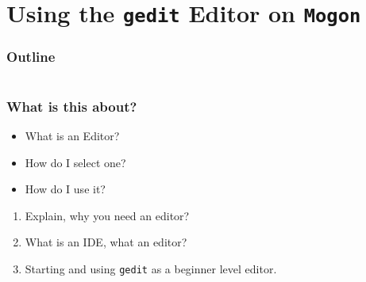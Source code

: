 \section{Using the \texttt{gedit} Editor on \texttt{Mogon}}

\begin{frame}
	\frametitle{Outline}
	\begin{columns}[t]
		\begin{column}{.5\textwidth}
			\tableofcontents[sections={1-9},currentsection]
		\end{column}
		\begin{column}{.5\textwidth}
			\tableofcontents[sections={10-18},currentsection]
		\end{column}
	\end{columns}
\end{frame}

\begin{frame}
	\frametitle{What is this about?}
	\begin{question}[Questions]\begin{itemize}
			\item What is an Editor?
			\item How do I select one?
			\item How do I use it?
		\end{itemize}
	\end{question}
	\begin{docs}[Objectives]
		\begin{enumerate}
			\item Explain, why you need an editor?
			\item What is an IDE, what an editor?
			\item Starting and using \texttt{gedit} as a beginner level editor.
		\end{enumerate}
	\end{docs}
\end{frame}

